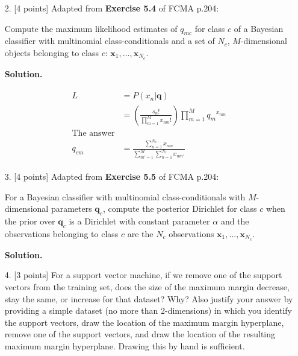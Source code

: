 \documentclass[10pt]{article}
\begin{document}
\begin{itemize}
\item[2.]  [4 points]
Adapted from {\bf Exercise 5.4} of FCMA p.204:

Compute the maximum likelihood estimates of $q_{mc}$ for class $c$ of a Bayesian classifier with multinomial class-conditionals and a set of $N_c$, $M$-dimensional objects belonging to class $c$: $\mathbf{x}_1, ..., \mathbf{x}_{N_c}$.

{\bf Solution.} %

\begin{eqnarray*}
\begin{aligned}
L &= P(x_n | \mathbf{q})
\\
&= \left( \frac{s_n !}{\prod_{m=1}^M x_{nm} !} \right)
\prod_{m=1}^M {q_m}^{x_{nm}}
\\
\text{The answer}
\\
q_{cm} &= \frac{ \sum_{n=1}^{N_c} x_{nm} } { \sum_{m'=1}^M \sum_{n=1}^{N_c} x_{nm'} }
\end{aligned}
\end{eqnarray*}


\item[3.]  [4 points]  
Adapted from {\bf Exercise 5.5} of FCMA p.204:

For a Bayesian classifier with multinomial class-conditionals with $M$-dimensional parameters $\mathbf{q}_c$, compute the posterior Dirichlet for class $c$ when the prior over $\mathbf{q}_c$ is a Dirichlet with constant parameter $\alpha$ and the observations belonging to class $c$ are the $N_c$ observations $\mathbf{x}_1, ..., \mathbf{x}_{N_c}$.

{\bf Solution.} %







\item[4.]  [3 points]
For a support vector machine, if we remove one of the support vectors from the training set, does the size of the maximum margin decrease, stay the same, or increase for that dataset?  Why?  Also justify your answer by providing a simple dataset (no more than 2-dimensions) in which you identify the support vectors, draw the location of the maximum margin hyperplane, remove one of the support vectors, and draw the location of the resulting maximum margin hyperplane.  Drawing this by hand is sufficient.


\end{itemize}
\end{document}
